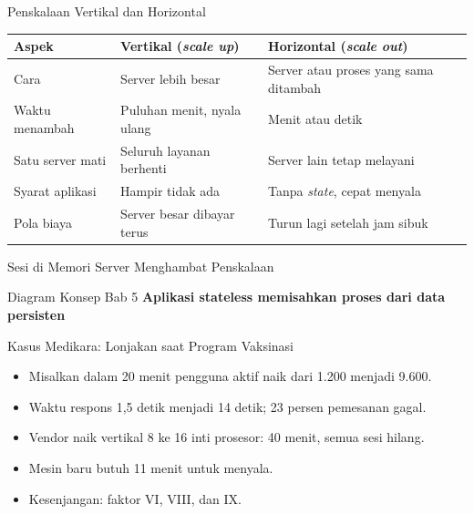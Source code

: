 \documentclass[aspectratio=169, table, 12pt]{beamer}
\begin{document}
\begin{frame}{{\Large Penskalaan Vertikal dan Horizontal}}
  \vspace{4pt}
  \footnotesize
  \begin{tabularx}{\textwidth}{|p{2.8cm}|Y|Y|}
    \hline
    \textbf{Aspek} & \textbf{Vertikal (\textit{scale up})} &
      \textbf{Horizontal (\textit{scale out})} \\
    \hline
    Cara & Server lebih besar & Server atau proses yang sama ditambah \\
    \hline
    Waktu menambah & Puluhan menit, nyala ulang & Menit atau detik \\
    \hline
    Satu server mati & Seluruh layanan berhenti & Server lain tetap melayani \\
    \hline
    Syarat aplikasi & Hampir tidak ada & Tanpa \textit{state}, cepat menyala \\
    \hline
    Pola biaya & Server besar dibayar terus & Turun lagi setelah jam sibuk \\
    \hline
  \end{tabularx}
\end{frame}

\begin{frame}{{\Large Sesi di Memori Server Menghambat Penskalaan}}
  \centering
\end{frame}

\begin{frame}{{\Large Diagram Konsep Bab 5}}
  \centering
  {\small\bfseries Aplikasi stateless memisahkan proses dari data persisten}\par\medskip
\end{frame}

\begin{frame}{{\Large Kasus Medikara: Lonjakan saat Program Vaksinasi}}
  \vspace{10pt}
  \begin{itemize}
    \item Misalkan dalam 20 menit pengguna aktif naik dari 1.200 menjadi 9.600.
    \item Waktu respons 1,5 detik menjadi 14 detik; 23 persen pemesanan gagal.
    \item Vendor naik vertikal 8 ke 16 inti prosesor: 40 menit, semua sesi hilang.
    \item Mesin baru butuh 11 menit untuk menyala.
    \item Kesenjangan: faktor VI, VIII, dan IX.
  \end{itemize}
\end{frame}
\end{document}
